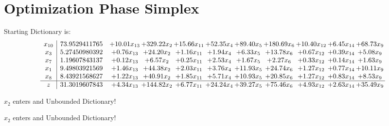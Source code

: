 \documentclass[9pt]{article}
\begin{document}
\section{Optimization Phase Simplex}
Starting Dictionary is:
\[\begin{array}{c| c c@{\hskip 2pt} c@{\hskip 2pt} c@{\hskip 2pt} c@{\hskip 2pt} c@{\hskip 2pt} c@{\hskip 2pt} c@{\hskip 2pt} c@{\hskip 2pt} c@{\hskip 2pt} }
 x_{10}   &  73.9529411765 & + 10.01 x_{13} & + 329.22 x_{2} & + 15.66 x_{11} & + 52.35 x_{4} & + 89.40 x_{5} & + 180.69 x_{6} & + 10.40 x_{12} & +  6.45 x_{14} & + 68.73 x_{9}\\
 x_{3}   &  5.27450980392 & +  0.76 x_{13} & + 24.20 x_{2} & +  1.16 x_{11} & +  1.94 x_{4} & +  6.33 x_{5} & + 13.78 x_{6} & +  0.67 x_{12} & +  0.39 x_{14} & +  5.08 x_{9}\\
 x_{7}   &  1.19607843137 & +  0.12 x_{13} & +  6.57 x_{2} & +  0.25 x_{11} & +  2.53 x_{4} & +  1.67 x_{5} & +  2.27 x_{6} & +  0.33 x_{12} & +  0.14 x_{14} & +  1.63 x_{9}\\
 x_{1}   &  9.49803921569 & +  1.46 x_{13} & + 44.38 x_{2} & +  2.03 x_{11} & +  3.76 x_{4} & + 11.93 x_{5} & + 24.74 x_{6} & +  1.27 x_{12} & +  0.77 x_{14} & + 10.11 x_{9}\\
 x_{8}   &  8.43921568627 & +  1.22 x_{13} & + 40.91 x_{2} & +  1.85 x_{11} & +  5.71 x_{4} & + 10.93 x_{5} & + 20.85 x_{6} & +  1.27 x_{12} & +  0.83 x_{14} & +  8.53 x_{9}\\
\hline
z    &  31.3019607843 & +  4.34 x_{13} & + 144.82 x_{2} & +  6.77 x_{11} & + 24.24 x_{4} & + 39.27 x_{5} & + 75.46 x_{6} & +  4.93 x_{12} & +  2.63 x_{14} & + 35.49 x_{9}\\
\end{array}\]


 $ x_{2} $ enters and Unbounded Dictionary!


 $ x_{2} $ enters and Unbounded Dictionary!
\end{document}

